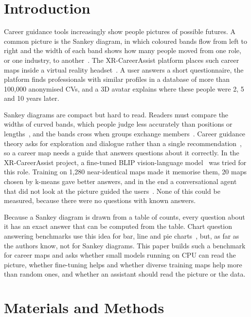 \documentclass[preprints,article,accept,moreauthors]{Definitions/mdpi}
\begin{document}
\section{Introduction}

Career guidance tools increasingly show people pictures of possible futures. A common picture is the Sankey diagram, in which coloured bands flow from left to right and the width of each band shows how many people moved from one role, or one industry, to another~\cite{schmidt2008,riehmann2005}. The XR-CareerAssist platform places such career maps inside a virtual reality headset~\cite{tantaroudas2026salento,tantaroudas2026ore,tantaroudas2026arxiv}. A user answers a short questionnaire, the platform finds professionals with similar profiles in a database of more than 100,000 anonymised CVs, and a 3D avatar explains where these people were 2, 5 and 10 years later.

Sankey diagrams are compact but hard to read. Readers must compare the widths of curved bands, which people judge less accurately than positions or lengths~\cite{cleveland1984}, and the bands cross when groups exchange members~\cite{zarate2018}. Career guidance theory asks for exploration and dialogue rather than a single recommendation~\cite{savickas2012,leung2022}, so a career map needs a guide that answers questions about it correctly. In the XR-CareerAssist project, a fine-tuned BLIP vision-language model~\cite{li2022blip} was tried for this role. Training on 1,280 near-identical maps made it memorise them, 20 maps chosen by k-means gave better answers, and in the end a conversational agent that did not look at the picture guided the users~\cite{tantaroudas2026ore}. None of this could be measured, because there were no questions with known answers.

Because a Sankey diagram is drawn from a table of counts, every question about it has an exact answer that can be computed from the table. Chart question answering benchmarks use this idea for bar, line and pie charts~\cite{kahou2018,kafle2018,methani2020,masry2022}, but, as far as the authors know, not for Sankey diagrams. This paper builds such a benchmark for career maps and asks whether small models running on CPU can read the picture, whether fine-tuning helps and whether diverse training maps help more than random ones, and whether an assistant should read the picture or the data. 

\section{Materials and Methods}
\end{document}
